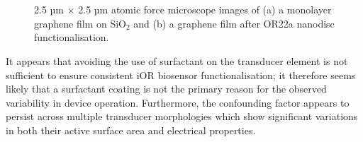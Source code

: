 \documentclass[
  a4paper,
]{scrbook}
\begin{document}
\begin{figure}
\begin{minipage}[t]{0.03\linewidth}
{{}

}

\end{minipage}%
%
\begin{minipage}[t]{0.01\linewidth}

{\centering 

~

}

\end{minipage}%
%
\begin{minipage}[t]{0.46\linewidth}

{\centering 


}

\end{minipage}%
%
\begin{minipage}[t]{0.01\linewidth}

{\centering 

~

}

\end{minipage}%

\caption{\label{fig-graphene-AFM-comparison}2.5 µm \(\times\) 2.5 µm
atomic force microscope images of (a) a monolayer graphene film on
SiO\(_2\) and (b) a graphene film after OR22a nanodisc
functionalisation.}

\end{figure}

It appears that avoiding the use of surfactant on the transducer element
is not sufficient to ensure consistent iOR biosensor functionalisation;
it therefore seems likely that a surfactant coating is not the primary
reason for the observed variability in device operation. Furthermore,
the confounding factor appears to persist across multiple transducer
morphologies which show significant variations in both their active
surface area and electrical properties.
\end{document}
